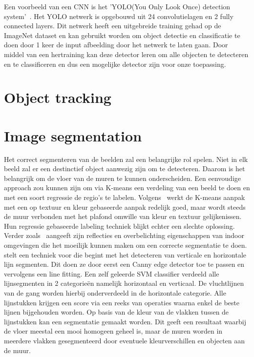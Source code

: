             Een voorbeeld van een CNN is het 'YOLO(You Only Look Once) detection system'~\cite{Redmon_2016}. Het YOLO netwerk is opgebouwd uit 24 convolutielagen en 2 fully connected layers.
            Dit netwerk heeft een uitgebreide training gehad op de ImageNet dataset en kan gebruikt worden om object detectie en classificatie te doen door 1 keer de input afbeelding door het netwerk te laten gaan.
            Door middel van een hertraining kan deze detector leren om alle objecten te detecteren en te classificeren en dus een mogelijke detector zijn voor onze toepassing.
            

    \section{Object tracking}

    \section{Image segmentation}
        Het correct segmenteren van de beelden zal een belangrijke rol spelen. Niet in elk beeld zal er een destinctief object aanwezig zijn om te detecteren. Daarom is het belangrijk om de vloer van
        de muren te kunnen onderscheiden. Een eenvoudige approach zou kunnen zijn om via K-means een verdeling van een beeld te doen en met een soort regressie de regio's te labelen. 
        Volgens~\cite{zhangwall} werkt de K-means aanpak met een op textuur en kleur gebaseerde aanpak redelijk goed, maar wordt steeds de muur verbonden met het plafond omwille van kleur en textuur gelijkenissen.
        Hun regressie gebaseerde labeling techniek blijkt echter een slechte oplossing. Verder zoals~\cite{Li2010} aangeeft zijn reflecties en overbelichting eigenschappen van indoor omgevingen die het moeilijk kunnen maken om
        een correcte segmentatie te doen.
        \cite{Li2010} stelt een techniek voor die begint met het detecteren van verticale en horizontale lijn segmenten. Dit doen ze door eerst een Canny edge detector\cite{Canny} toe te passen en vervolgens een line fitting.
        Een zelf geleerde SVM classifier verdeeld alle lijnsegmenten in 2 categorie\"{e}n namelijk horizontaal en verticaal. De vluchtlijnen van de gang worden hierbij onderverdeeld in de horizontale categorie.
        Alle lijnstukken krijgen een score via een reeks van operaties waarna enkel de beste lijnen bijgehouden worden. Op basis van de kleur van de vlakken tussen de lijnstukken kan een segmentatie gemaakt worden.
        Dit geeft een resultaat waarbij de vloer meestal een mooi homogeen geheel is, maar de muren worden in meerdere vlakken gesegmenteerd door eventuele kleurverschillen en objecten aan de muur.
        
